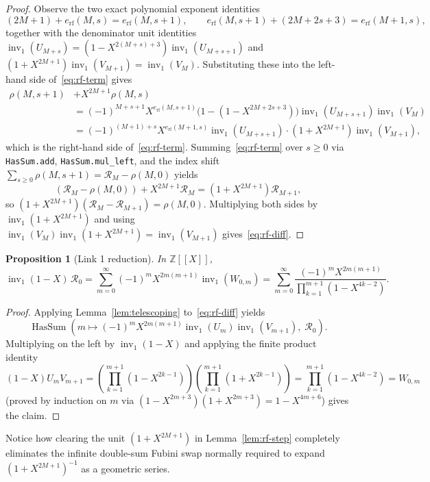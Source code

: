 \documentclass[11pt]{article}
\newcommand{\llbracket}{[\![}
\newcommand{\rrbracket}{]\!]}
\newtheorem{proposition}[theorem]{Proposition}
\theoremstyle{definition}
\newcommand{\Z}{\mathbb{Z}}
\newcommand{\inv}{\operatorname{inv}_1}
\begin{document}
\begin{proof}
Observe the two exact polynomial exponent identities
\[
(2M + 1) + e_{\mathrm{rf}}(M, s) = e_{\mathrm{rf}}(M, s + 1), \qquad e_{\mathrm{rf}}(M, s + 1) + (2M + 2s + 3) = e_{\mathrm{rf}}(M + 1, s),
\]
together with the denominator unit identities $\inv(U_{M+s}) = (1 - X^{2(M+s)+3}) \inv(U_{M+s+1})$ and $(1 + X^{2M+1}) \inv(V_{M+1}) = \inv(V_M)$. Substituting these into the left-hand side of~\eqref{eq:rf-term} gives
\begin{align*}
\rho(M, s + 1) &+ X^{2M+1} \rho(M, s) \\
&= (-1)^{M+s+1} X^{e_{\mathrm{rf}}(M, s+1)} \bigl(1 - (1 - X^{2M+2s+3})\bigr) \inv(U_{M+s+1}) \inv(V_M) \\
&= (-1)^{(M+1)+s} X^{e_{\mathrm{rf}}(M+1, s)} \inv(U_{M+s+1}) \cdot (1 + X^{2M+1}) \inv(V_{M+1}),
\end{align*}
which is the right-hand side of~\eqref{eq:rf-term}. Summing~\eqref{eq:rf-term} over $s \ge 0$ via \texttt{HasSum.add}, \texttt{HasSum.mul\_left}, and the index shift $\sum_{s \ge 0} \rho(M, s + 1) = \mathcal{R}_M - \rho(M, 0)$ yields
\[
(\mathcal{R}_M - \rho(M, 0)) + X^{2M+1} \mathcal{R}_M = (1 + X^{2M+1}) \mathcal{R}_{M+1},
\]
so $(1 + X^{2M+1})(\mathcal{R}_M - \mathcal{R}_{M+1}) = \rho(M, 0)$. Multiplying both sides by $\inv(1 + X^{2M+1})$ and using $\inv(V_M)\inv(1 + X^{2M+1}) = \inv(V_{M+1})$ gives~\eqref{eq:rf-diff}.
\end{proof}

\begin{proposition}[Link 1 reduction]
\label{prop:link1}
In $\Z\llbracket X \rrbracket$,
\[
\inv(1 - X)\,\mathcal{R}_0 = \sum_{m=0}^{\infty} (-1)^m X^{2m(m+1)} \inv(W_{0, m})
= \sum_{m=0}^{\infty} \frac{(-1)^m X^{2m(m+1)}}{\prod_{k=1}^{m+1} (1 - X^{4k-2})}.
\]
\end{proposition}

\begin{proof}
Applying Lemma~\ref{lem:telescoping} to~\eqref{eq:rf-diff} yields
\[
\operatorname{HasSum}\!\left(m \mapsto (-1)^m X^{2m(m+1)} \inv(U_m) \inv(V_{m+1}),\; \mathcal{R}_0\right).
\]
Multiplying on the left by $\inv(1 - X)$ and applying the finite product identity
\[
(1 - X) U_m V_{m+1}
= \left(\prod_{k=1}^{m+1} (1 - X^{2k-1})\right)\!\left(\prod_{k=1}^{m+1} (1 + X^{2k-1})\right)
= \prod_{k=1}^{m+1} (1 - X^{4k-2}) = W_{0, m}
\]
(proved by induction on $m$ via $(1 - X^{2m+3})(1 + X^{2m+3}) = 1 - X^{4m+6}$) gives the claim.
\end{proof}

Notice how clearing the unit $(1 + X^{2M+1})$ in Lemma~\ref{lem:rf-step} completely eliminates the infinite double-sum Fubini swap normally required to expand $(1 + X^{2M+1})^{-1}$ as a geometric series.
\end{document}
